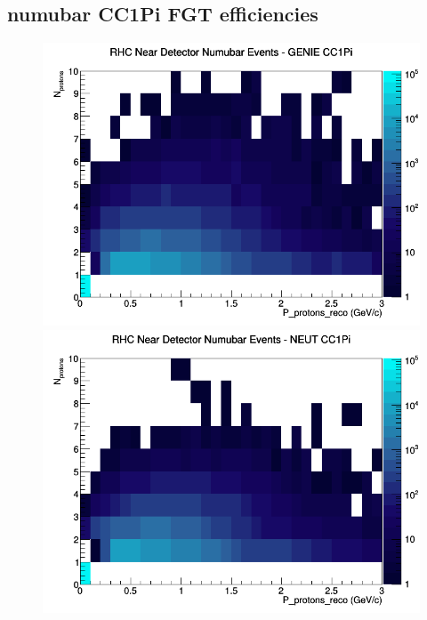 \documentclass[12pt]{article}
\begin{document}
\subsection{numubar CC1Pi FGT efficiencies}
\begin{figure}[h]
\includegraphics[width=\linewidth]{eff_N_P/FGT/protons/CC1Pi_RHC_ND_numubar_N_P_GENIE.png}
\endminipage
{}
\includegraphics[width=\linewidth]{eff_N_P/FGT/protons/CC1Pi_RHC_ND_numubar_N_P_NEUT.png}
\endminipage
{}

\end{figure}
\end{document}
